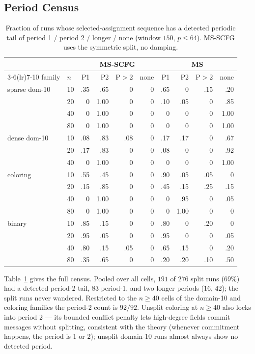 \documentclass[letterpaper]{article} %
\theoremstyle{definition}
\theoremstyle{remark}
\begin{document}
\subsection{Period Census}

\begin{table}[t]
\centering
\caption{Fraction of runs whose selected-assignment sequence has a
detected periodic tail of period 1 / period 2 / longer / none (window
$150$, $p \le 64$).  MS-SCFG uses the symmetric split, no damping.}
\label{tab:census}
\scriptsize
\begin{tabular}{llrrrrrrrr}
\toprule
& & \multicolumn{4}{c}{MS-SCFG} & \multicolumn{4}{c}{MS} \\
\cmidrule(lr){3-6}\cmidrule(lr){7-10}
family & $n$ & P1 & P2 & P$>$2 & none & P1 & P2 & P$>$2 & none \\
\midrule
sparse dom-10 & 10 & .35 & .65 & 0 & 0 & .65 & 0 & .15 & .20 \\
 & 20 & 0 & 1.00 & 0 & 0 & .10 & .05 & 0 & .85 \\
 & 40 & 0 & 1.00 & 0 & 0 & 0 & 0 & 0 & 1.00 \\
 & 80 & 0 & 1.00 & 0 & 0 & 0 & 0 & 0 & 1.00 \\
dense dom-10 & 10 & .08 & .83 & .08 & 0 & .17 & .17 & 0 & .67 \\
 & 20 & .17 & .83 & 0 & 0 & .08 & 0 & 0 & .92 \\
 & 40 & 0 & 1.00 & 0 & 0 & 0 & 0 & 0 & 1.00 \\
coloring & 10 & .55 & .45 & 0 & 0 & .90 & .05 & .05 & 0 \\
 & 20 & .15 & .85 & 0 & 0 & .45 & .15 & .25 & .15 \\
 & 40 & 0 & 1.00 & 0 & 0 & 0 & .95 & 0 & .05 \\
 & 80 & 0 & 1.00 & 0 & 0 & 0 & 1.00 & 0 & 0 \\
binary & 10 & .85 & .15 & 0 & 0 & .80 & 0 & .20 & 0 \\
 & 20 & .95 & .05 & 0 & 0 & .95 & 0 & 0 & .05 \\
 & 40 & .80 & .15 & .05 & 0 & .65 & .15 & 0 & .20 \\
 & 80 & .35 & .65 & 0 & 0 & .20 & .20 & .10 & .50 \\
\bottomrule
\end{tabular}
\end{table}

Table~\ref{tab:census} gives the full census.  Pooled over all cells,
$191$ of $276$ split runs ($69\%$) had a detected period-2 tail, $83$
period-1, and two longer periods ($16$, $42$); the split runs never
wandered.  Restricted to the $n \ge 40$ cells of the domain-10 and
coloring families the period-2 count is $92/92$.  Unsplit coloring at
$n \ge 40$ also locks into period 2 --- its bounded conflict penalty
lets high-degree fields commit messages without splitting, consistent
with the theory (whenever commitment happens, the period is $1$ or
$2$); unsplit domain-10 runs almost always show no detected period.
\end{document}
